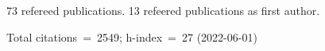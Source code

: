 73 refereed publications. 13 refeered publications as first author.

Total citations~=~2549; h-index~=~27 (2022-06-01)